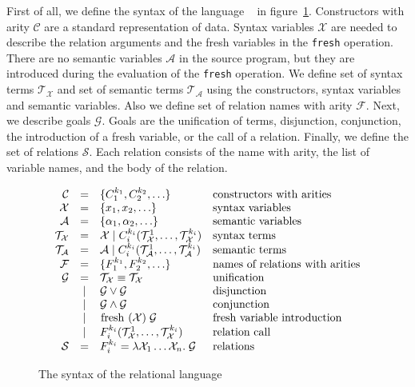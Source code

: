 First of all, we define the syntax of the language \mk~ in figure~\ref{fair:syntax}.
Constructors with arity $\mathcal{C}$ are a standard representation of data.
Syntax variables $\mathcal{X}$ are needed to describe the relation arguments and the fresh variables in the \lstinline{fresh} operation.
There are no semantic variables $\mathcal{A}$ in the source program, but they are introduced during the evaluation of the \lstinline{fresh} operation. 
We define set of syntax terms $\mathcal{T}_\mathcal{X}$ and set of semantic terms $\mathcal{T}_\mathcal{A}$ using the constructors, syntax variables and semantic variables. 
Also we define set of relation names with arity $\mathcal{F}$.
Next, we describe goals $\mathcal{G}$. Goals are the unification of terms, disjunction, conjunction, the introduction of a fresh variable, or the call of a relation. 
Finally, we define the set of relations $\mathcal{S}$. Each relation consists of the name with arity, the list of variable names, and the body of the relation.

\begin{figure}[h]
\[
  \begin{array}{rcll}
     \mathcal{C} & = & \{ C_1^{k_1}, C_2^{k_2}, \ldots \} 
     & \mbox{constructors with arities} 
     \\
     \mathcal{X} & = & \{x_1, x_2, \ldots \} 
     & \mbox{syntax variables} 
     \\
     \mathcal{A} & = & \{\alpha_1, \alpha_2, \ldots \} 
     & \mbox{semantic variables} 
     \\
     \mathcal{T}_\mathcal{X} & = & \mathcal{X} \mid C_i^{k_i}(\mathcal{T}_\mathcal{X}^1, \ldots, \mathcal{T}_\mathcal{X}^{k_i})
     & \mbox{syntax terms} 
     \\
     \mathcal{T}_\mathcal{A} & = & \mathcal{A} \mid C_i^{k_i}(\mathcal{T}_\mathcal{A}^1, \ldots, \mathcal{T}_\mathcal{A}^{k_i})
     & \mbox{semantic terms} 
     \\
     \mathcal{F} & = & \{F_1^{k_1}, F_2^{k_2}, \ldots \} 
     & \mbox{names of relations with arities} 
     \\
     \mathcal{G} & =    & \mathcal{T}_\mathcal{X} \equiv \mathcal{T}_\mathcal{X} & \mbox{unification} \\
                 & \mid & \mathcal{G} \lor \mathcal{G} & \mbox{disjunction} \\
                 & \mid & \mathcal{G} \land \mathcal{G} & \mbox{conjunction} \\
                 & \mid & \mbox{\lstinline|fresh|} \; (\mathcal{X}) \; \mathcal{G} & \mbox{fresh variable introduction} \\
                 & \mid &  F_i^{k_i}(\mathcal{T}_\mathcal{X}^1, \ldots, \mathcal{T}_\mathcal{X}^{k_i}) & \mbox{relation call} \\
    \mathcal{S} & = &F_i^{k_i} = \lambda \mathcal{X}_1 \ldots \mathcal{X}_n. \; \mathcal{G} & \mbox{relations}
  \end{array}
\]
    \caption{The syntax of the relational language}
    \label{fair:syntax}
\end{figure}

